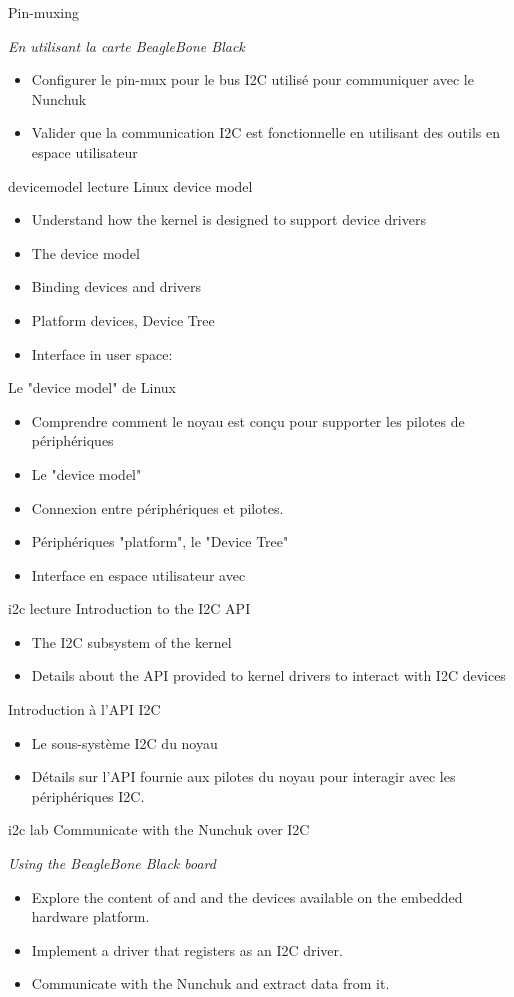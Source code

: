 {Pin-muxing}
{
  {\em En utilisant la carte BeagleBone Black}
  \begin{itemize}
  \item Configurer le pin-mux pour le bus I2C utilisé pour communiquer
    avec le Nunchuk
  \item Valider que la communication I2C est fonctionnelle en
    utilisant des outils en espace utilisateur
  \end{itemize}
}
{devicemodel}
{lecture}
{Linux device model}
{
  \begin{itemize}
  \item Understand how the kernel is designed to support device
    drivers
  \item The device model
  \item Binding devices and drivers
  \item Platform devices, Device Tree
  \item Interface in user space: 
  \end{itemize}
}
{Le "device model" de Linux}
{
  \begin{itemize}
  \item Comprendre comment le noyau est conçu pour supporter les pilotes
    de périphériques
  \item Le "device model"
  \item Connexion entre périphériques et pilotes.
  \item Périphériques "platform", le "Device Tree"
  \item Interface en espace utilisateur avec 
  \end{itemize}
}
{i2c}
{lecture}
{Introduction to the I2C API}
{
  \begin{itemize}
  \item The I2C subsystem of the kernel
  \item Details about the API provided to kernel drivers to interact
    with I2C devices
  \end{itemize}
}
{Introduction à l'API I2C}
{
  \begin{itemize}
  \item Le sous-système I2C du noyau
  \item Détails sur l'API fournie aux pilotes du noyau pour interagir
    avec les périphériques I2C.
  \end{itemize}
}
{i2c}
{lab}
{Communicate with the Nunchuk over I2C}
{
  {\em Using the BeagleBone Black board}
  \begin{itemize}
  \item Explore the content of  and  and the
    devices available on the embedded hardware platform.
  \item Implement a driver that registers as an I2C driver.
  \item Communicate with the Nunchuk and extract data from it.
  \end{itemize}
}
